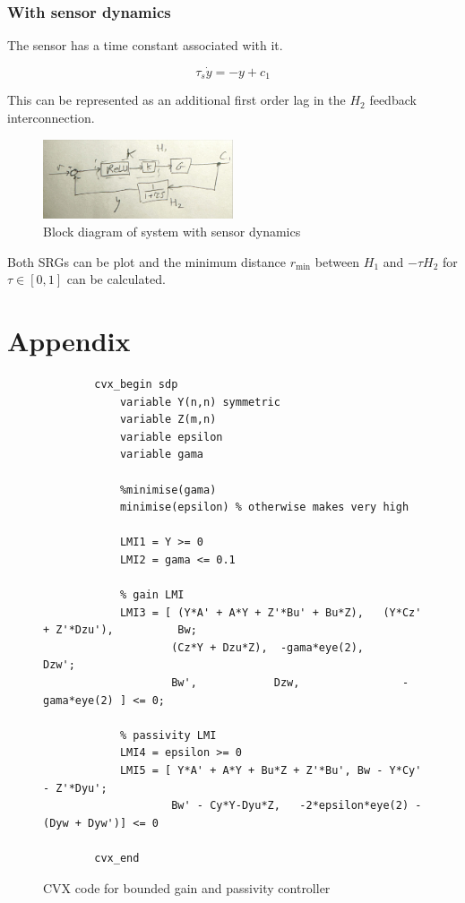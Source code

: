 \documentclass{article}
\begin{document}
\subsubsection{With sensor dynamics}

The sensor has a time constant associated with it.

\begin{equation}
    \tau_s \dot{y} = -y + c_1
\end{equation}

This can be represented as an additional first order lag in the $H_2$ feedback interconnection.

\begin{figure}[H]
    \centering
    \includegraphics[width=0.5\textwidth]{figures/sensor_dynamics.jpg}
    \caption{Block diagram of system with sensor dynamics}
    \label{fig:sensor_dynamic_block}
\end{figure}

Both SRGs can be plot and the minimum distance $r_\text{min}$ between $H_1$ and $-\tau H_2 $ for $\tau \in [0,1]$ can be calculated.

\section{Appendix}


\begin{figure}[H]
    \centering
    \begin{lstlisting}
        cvx_begin sdp
            variable Y(n,n) symmetric
            variable Z(m,n)
            variable epsilon
            variable gama
            
            %minimise(gama)
            minimise(epsilon) % otherwise makes very high

            LMI1 = Y >= 0
            LMI2 = gama <= 0.1
            
            % gain LMI
            LMI3 = [ (Y*A' + A*Y + Z'*Bu' + Bu*Z),   (Y*Cz' + Z'*Dzu'),          Bw;
                    (Cz*Y + Dzu*Z),  -gama*eye(2),      Dzw';
                    Bw',            Dzw,                -gama*eye(2) ] <= 0;
            
            % passivity LMI
            LMI4 = epsilon >= 0
            LMI5 = [ Y*A' + A*Y + Bu*Z + Z'*Bu', Bw - Y*Cy' - Z'*Dyu';
                    Bw' - Cy*Y-Dyu*Z,   -2*epsilon*eye(2) - (Dyw + Dyw')] <= 0
                
        cvx_end
    \end{lstlisting}
    \caption{CVX code for bounded gain and passivity controller}
    \label{fig:bounded_passive_lmi}
\end{figure}
\end{document}
